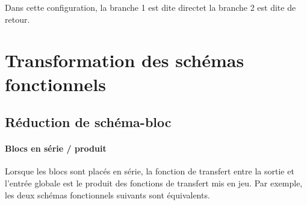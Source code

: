 \begin{center}
\end{center}

Dans cette configuration, la branche 1 est dite \og direct\fg et la branche 2 est dite de \og retour\fg.

\section{Transformation des schémas fonctionnels}

\subsection{Réduction de schéma-bloc}

\paragraph{Blocs en série / produit}
Lorsque les blocs sont placés en série, la fonction de transfert 
entre la sortie et l'entrée globale est le produit des fonctions de transfert mis en jeu.
Par exemple, les deux schémas fonctionnels suivants sont équivalents.

\begin{center}

\end{center}

